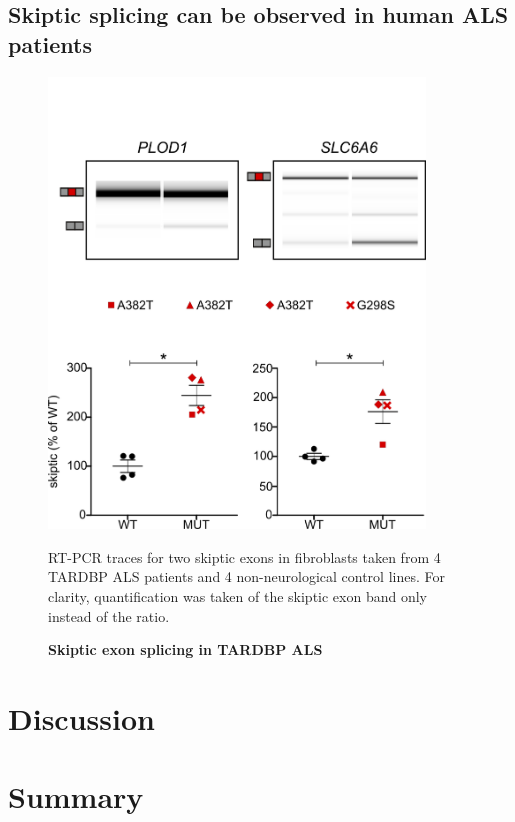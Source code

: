 \subsection{Skiptic splicing can be observed in human ALS patients}
\begin{figure}[h!]
	\centering
	\includegraphics[width=10cm]{Figures/05_tdp_mice/skiptic_patients.png}
	\caption{\textbf{Skiptic exon splicing in TARDBP ALS}}
		RT-PCR traces for two skiptic exons in fibroblasts taken from 4 TARDBP ALS patients and 4 non-neurological control lines. For clarity, quantification was taken of the skiptic exon band only instead of the ratio.
	\label{fig:skiptic_patients}
\end{figure}



\section{Discussion}

\section{Summary}


